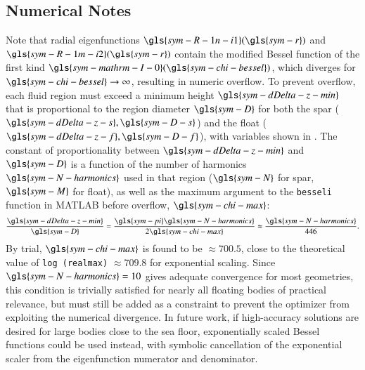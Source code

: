 \subsection{Numerical Notes}\label{sec:appendix-meem-numerics}
Note that radial eigenfunctions $\gls{sym-R-1n-i1}(\gls{sym-r})$ and $\gls{sym-R-1m-i2}(\gls{sym-r})$ contain the modified Bessel function of the first kind $\gls{sym-mathrm-I-0}(\gls{sym-chi-bessel})$, which diverges for $\gls{sym-chi-bessel}\rightarrow \infty$, resulting in numeric overflow.
To prevent overflow, each fluid region must exceed a minimum height $\gls{sym-dDelta-z-min}$ that is proportional to the region diameter $\gls{sym-D}$ for both the spar ($\gls{sym-dDelta-z-s}, \gls{sym-D-s}$) and the float ($\gls{sym-dDelta-z-f}, \gls{sym-D-f}$), with variables shown in .
The constant of proportionality between $\gls{sym-dDelta-z-min}$ and $\gls{sym-D}$ is a function of the number of harmonics $\gls{sym-N-harmonics}$ used in that region ($\gls{sym-N}$ for spar, $\gls{sym-M}$ for float), as well as the maximum argument to the \texttt{besseli} function in MATLAB before overflow, $\gls{sym-chi-max}$:
\begin{equation}\label{eq:delta-z-min}
    \frac{\gls{sym-dDelta-z-min}}{\gls{sym-D}} = \frac{\gls{sym-pi}\gls{sym-N-harmonics}}{2\gls{sym-chi-max}} \approx \frac{\gls{sym-N-harmonics}}{446}.
\end{equation}
By trial, $\gls{sym-chi-max}$ is found to be $\approx 700.5$, close to the theoretical value of \texttt{log (realmax)} $\approx 709.8$ for exponential scaling.
Since $\gls{sym-N-harmonics}=10$ gives adequate convergence for most geometries, this condition is trivially satisfied for nearly all floating bodies of practical relevance, but must still be added as a constraint to prevent the optimizer from exploiting the numerical divergence.
In future work, if high-accuracy solutions are desired for large bodies close to the sea floor, exponentially scaled Bessel functions could be used instead, with symbolic cancellation of the exponential scaler from the eigenfunction numerator and denominator.

